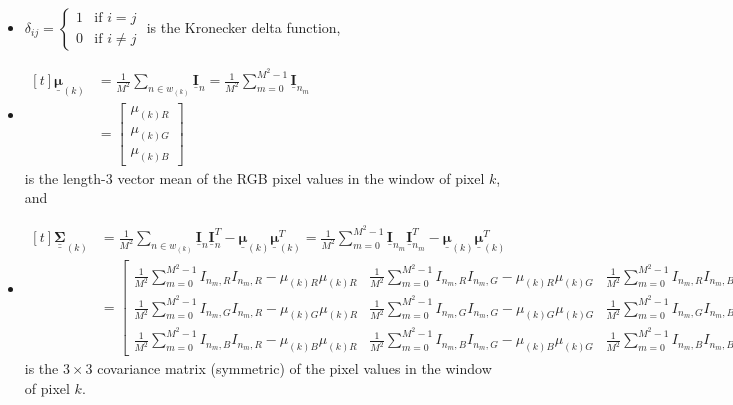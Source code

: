 \documentclass{article}
\newcommand{\bmat}[1]{\begin{bmatrix}#1\end{bmatrix}}
\theoremstyle{definition}
\def\vt#1{\underline{\mathbf{#1}}}
\def\vts#1{\underline{\boldsymbol{#1}}}
\def\mts#1{\underline{\underline{\boldsymbol{#1}}}}
\begin{document}
\begin{itemize}
    \item $\delta_{ij} = \begin{cases}
        1&\text{if $i=j$}\\
        0&\text{if $i\neq j$}
    \end{cases}$ is the Kronecker delta function,
    \item $\begin{aligned}[t]
        \vts \mu_{(k)} &= \frac1{M^2} \sum_{n\in w_{(k)}} \vt I_{n} = \frac1{M^2} \sum_{m=0}^{M^2-1} \vt I_{n_m} \\
        &= \bmat{\mu_{(k)R} \\ \mu_{(k)G} \\ \mu_{(k)B}}
    \end{aligned}$ \\
    is the length-$3$ vector mean of the RGB pixel values in the window of pixel $k$, and
    \item $\begin{aligned}[t]
        \mts \Sigma_{(k)}
        &= \frac1{M^2} \sum_{n\in w_{(k)}} \vt I_{n} \vt I_{n}^T  - \vts \mu_{(k)} \vts \mu_{(k)}^T = \frac1{M^2} \sum_{m=0}^{M^2-1} \vt I_{n_m} \vt I_{n_m}^T  - \vts \mu_{(k)} \vts \mu_{(k)}^T \\
        &= \left[\begin{smallmatrix}
            \frac1{M^2} \sum_{m=0}^{M^2-1} I_{n_m,R}I_{n_m,R} - \mu_{(k)R}\mu_{(k)R} & \frac1{M^2} \sum_{m=0}^{M^2-1} I_{n_m,R}I_{n_m,G} - \mu_{(k)R}\mu_{(k)G} & \frac1{M^2} \sum_{m=0}^{M^2-1} I_{n_m,R}I_{n_m,B} - \mu_{(k)R}\mu_{(k)B}\\
            \frac1{M^2} \sum_{m=0}^{M^2-1} I_{n_m,G}I_{n_m,R} - \mu_{(k)G}\mu_{(k)R} & \frac1{M^2} \sum_{m=0}^{M^2-1} I_{n_m,G}I_{n_m,G} - \mu_{(k)G}\mu_{(k)G} & \frac1{M^2} \sum_{m=0}^{M^2-1} I_{n_m,G}I_{n_m,B} - \mu_{(k)G}\mu_{(k)B}\\
            \frac1{M^2} \sum_{m=0}^{M^2-1} I_{n_m,B}I_{n_m,R} - \mu_{(k)B}\mu_{(k)R} & \frac1{M^2} \sum_{m=0}^{M^2-1} I_{n_m,B}I_{n_m,G} - \mu_{(k)B}\mu_{(k)G} & \frac1{M^2} \sum_{m=0}^{M^2-1} I_{n_m,B}I_{n_m,B} - \mu_{(k)B}\mu_{(k)B}
       \end{smallmatrix}\right]
    \end{aligned}$\\
    is the $3\times 3$ covariance matrix (symmetric) of the pixel values in the window of pixel $k$.
\end{itemize}
\end{document}
